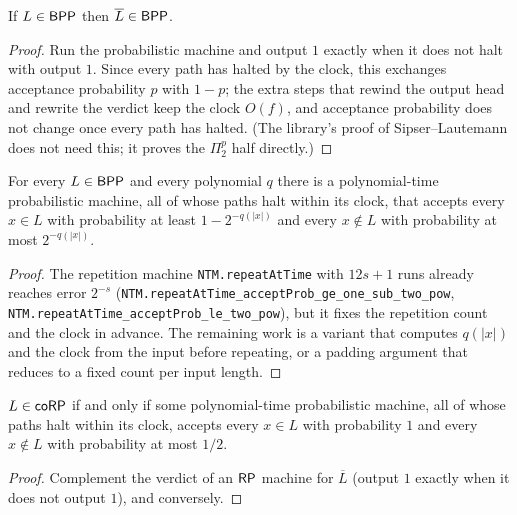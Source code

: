\begin{theorem}
  \label{thm:randomness-bpp-compl}
  If $L \in \mathsf{BPP}$ then $\overline{L} \in \mathsf{BPP}$.
\end{theorem}
\begin{proof}
  Run the probabilistic machine and output $1$ exactly when it does not halt
  with output $1$. Since every path has halted by the clock, this exchanges
  acceptance probability $p$ with $1 - p$; the extra steps that rewind the
  output head and rewrite the verdict keep the clock $O(f)$, and acceptance
  probability does not change once every path has halted. (The library's proof
  of Sipser--Lautemann does not need this; it proves the $\Pi^p_2$ half
  directly.)
\end{proof}

\begin{theorem}
  \label{thm:randomness-bpp-amplification}
  For every $L \in \mathsf{BPP}$ and every polynomial $q$ there is a
  polynomial-time probabilistic machine, all of whose paths halt within its
  clock, that accepts every $x \in L$ with probability at least
  $1 - 2^{-q(|x|)}$ and every $x \notin L$ with probability at most
  $2^{-q(|x|)}$.
\end{theorem}
\begin{proof}
  The repetition machine \texttt{NTM.repeatAtTime} with $12s + 1$ runs
  already reaches error $2^{-s}$
  (\texttt{NTM.repeatAtTime\_acceptProb\_ge\_one\_sub\_two\_pow},
  \texttt{NTM.repeatAtTime\_acceptProb\_le\_two\_pow}), but it fixes the
  repetition count and the clock in advance. The remaining work is a variant
  that computes $q(|x|)$ and the clock from the input before repeating, or a
  padding argument that reduces to a fixed count per input length.
\end{proof}

\begin{theorem}
  \label{thm:randomness-corp-direct}
  $L \in \mathsf{coRP}$ if and only if some polynomial-time probabilistic machine,
  all of whose paths halt within its clock, accepts every $x \in L$ with
  probability $1$ and every $x \notin L$ with probability at most $1/2$.
\end{theorem}
\begin{proof}
  Complement the verdict of an $\mathsf{RP}$ machine for $\overline{L}$ (output $1$
  exactly when it does not output $1$), and conversely.
\end{proof}

